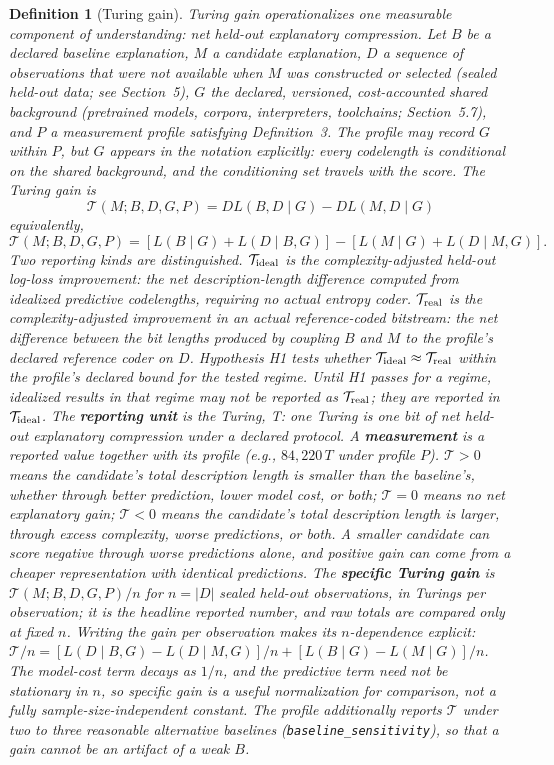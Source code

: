 \documentclass[11pt]{article}
\newtheorem{definition}{Definition}
\begin{document}
\begin{definition}[Turing gain]
Turing gain operationalizes one measurable component of understanding: net held-out explanatory compression. Let \(B\) be a declared baseline explanation, \(M\) a candidate explanation, \(D\) a sequence of observations that were not available when \(M\) was constructed or selected (sealed held-out data; see Section~5), \(G\) the declared, versioned, cost-accounted shared background (pretrained models, corpora, interpreters, toolchains; Section~5.7), and \(P\) a measurement profile satisfying Definition~3. The profile may record \(G\) within \(P\), but \(G\) appears in the notation explicitly: every codelength is conditional on the shared background, and the conditioning set travels with the score. The Turing gain is
\[
\boxed{
\mathcal{T}(M;B,D,G,P)
=
DL(B,D\mid G)-DL(M,D\mid G)
}
\]
equivalently,
\[
\boxed{
\mathcal{T}(M;B,D,G,P)
=
\left[L(B\mid G)+L(D\mid B,G)\right]
-
\left[L(M\mid G)+L(D\mid M,G)\right].
}
\]
Two reporting kinds are distinguished. \(\mathcal{T}_{\rm ideal}\) is the complexity-adjusted held-out log-loss improvement: the net description-length difference computed from idealized predictive codelengths, requiring no actual entropy coder. \(\mathcal{T}_{\rm real}\) is the complexity-adjusted improvement in an actual reference-coded bitstream: the net difference between the bit lengths produced by coupling \(B\) and \(M\) to the profile's declared reference coder on \(D\). Hypothesis H1 tests whether \(\mathcal{T}_{\rm ideal}\approx\mathcal{T}_{\rm real}\) within the profile's declared bound for the tested regime. Until H1 passes for a regime, idealized results in that regime may not be reported as \(\mathcal{T}_{\rm real}\); they are reported in \(\mathcal{T}_{\rm ideal}\).
The \textbf{reporting unit} is the Turing, T: one Turing is one bit of net held-out explanatory compression under a declared protocol. A \textbf{measurement} is a reported value together with its profile (e.g., \(84{,}220\,T\) under profile \(P\)). \(\mathcal{T}>0\) means the candidate's total description length is smaller than the baseline's, whether through better prediction, lower model cost, or both; \(\mathcal{T}=0\) means no net explanatory gain; \(\mathcal{T}<0\) means the candidate's total description length is larger, through excess complexity, worse predictions, or both. A smaller candidate can score negative through worse predictions alone, and positive gain can come from a cheaper representation with identical predictions. The \textbf{specific Turing gain} is \(\mathcal{T}(M;B,D,G,P)/n\) for \(n=|D|\) sealed held-out observations, in Turings per observation; it is the headline reported number, and raw totals are compared only at fixed \(n\). Writing the gain per observation makes its \(n\)-dependence explicit: \(\mathcal{T}/n=[L(D\mid B,G)-L(D\mid M,G)]/n+[L(B\mid G)-L(M\mid G)]/n\). The model-cost term decays as \(1/n\), and the predictive term need not be stationary in \(n\), so specific gain is a useful normalization for comparison, not a fully sample-size-independent constant. The profile additionally reports \(\mathcal{T}\) under two to three reasonable alternative baselines (\texttt{baseline\_sensitivity}), so that a gain cannot be an artifact of a weak \(B\).
\end{definition}
\end{document}

